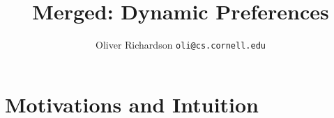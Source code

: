 \documentclass{article}
\title{Merged: Dynamic Preferences}
\author{Oliver Richardson  \texttt{oli@cs.cornell.edu}}
\begin{document}
	\maketitle
	
	
	
	
	
	\part{Motivations and Intuition}
\end{document}
